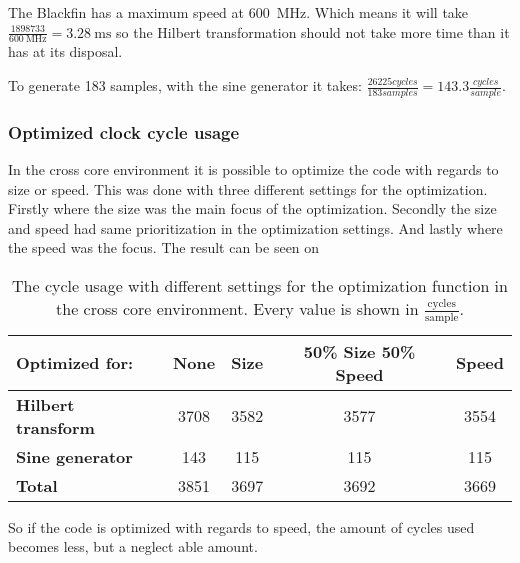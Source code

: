 The Blackfin has a maximum speed at \SI{600}{\mega\hertz}.
Which means it will take $\frac{\num{1898733}}{\SI{600}{\mega\hertz}} = {\SI{3.28}{\milli\second}}$ so the Hilbert transformation should not take more time than it has at its disposal.

To generate 183 samples, with the sine generator it takes: $\frac{26225 cycles}{183 samples} = 143.3\frac{cycles}{sample}$. 

\subsubsection{Optimized clock cycle usage}
In the cross core environment it is possible to optimize the code with regards to size or speed.
This was done with three different settings for the optimization. 
Firstly where the size was the main focus of the optimization. 
Secondly the size and speed had same prioritization in the optimization settings.
And lastly where the speed was the focus. The result can be seen on
\begin{table}
	\centering
	\begin{tabularx}{0.95\textwidth}{l c c c c}
		\toprule
		{\textbf{Optimized for:}} & \textbf{None} & \textbf{Size} & \textbf{50\% Size 50\% Speed} & \textbf{Speed} \\
		\midrule
		\textbf{Hilbert transform} & \num{3708} & \num{3582} & \num{3577} & \num{3554} \\
		\textbf{Sine generator} & \num{143} & \num{115} & \num{115} & \num{115} \\
		\textbf{Total} & \num{3851} & \num{3697} & \num{3692} & \num{3669} \\
		\bottomrule
	\end{tabularx}
	\caption{The cycle usage with different settings for the optimization function in the cross core environment. Every value is shown in $\frac{\text{cycles}}{\text{sample}}$.}
	\label{OptimizedCycleUsage}
\end{table}

So if the code is optimized with regards to speed, the amount of cycles used becomes less, but a neglect able amount.  

\FloatBarrier